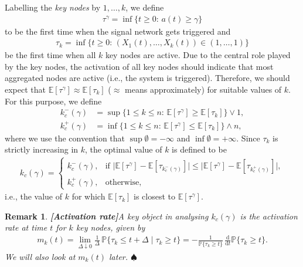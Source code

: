 \documentclass[11pt]{article}
\newtheorem{Remark}[Theorem]{Remark}
\numberwithin{equation}{section}
\renewcommand{\P}{\mathbb{P}}
\begin{document}
Labelling the \emph{key nodes} by $1,\ldots,k$, we define
\begin{align*}
\tau^\gamma = \inf\big\{t\geq 0\colon\, a(t)\geq \gamma\big\}
\end{align*}
to be the first time when the signal network gets triggered and
\begin{align*}
\tau_k = \inf\big\{t\geq 0\colon\, (X_{1}(t),\ldots ,X_k(t))\in (1,\ldots ,1)\big\}
\end{align*}
be the first time when all $k$ key nodes are active. Due to the central role played by the key nodes, the activation of all key nodes should indicate that most aggregated nodes are active (i.e., the system is triggered). Therefore, we should expect that $\mathbb{E}[\tau^\gamma] \approx \mathbb{E}[\tau_k]$ ($\approx$ means approximately) for suitable values of $k$. For this purpose, we define
\begin{align*}
k_c^-(\gamma) &= \sup\big\{1\leq k\leq n\colon\,\mathbb{E}[\tau^\gamma] \geq \mathbb{E}[\tau_k]\big\}\vee 1,\\
k_c^+(\gamma) &=\inf\big\{1\leq k\leq n\colon\,\mathbb{E}[\tau^\gamma] \leq \mathbb{E}[\tau_k]\big\}\wedge n,
\end{align*}
where we use the convention that $\sup\emptyset=-\infty$ and $\inf\emptyset=+\infty$. Since $\tau_k$ is strictly increasing in $k$, the optimal value of $k$ is defined to be
\begin{align*}
k_c(\gamma)  =
\begin{cases}
k_c^-(\gamma), &\text{if } \big|\mathbb{E}[\tau^\gamma] - \mathbb{E}[\tau_{k_c^-(\gamma)}]\big|\leq  \big|\mathbb{E}[\tau^\gamma] - \mathbb{E}[\tau_{k_c^+(\gamma)}]\big|,\\
k_c^+(\gamma), & \text{otherwise},
\end{cases}
\end{align*}
i.e., the value of $k$ for which $\mathbb{E}[\tau_k]$ is closest to $\mathbb{E}[\tau^\gamma]$.

\begin{Remark}{\bf [Activation rate]}\label{rem:act}
\rm{A key object in analysing $k_c(\gamma)$ is the activation rate at time $t$ for $k$ key nodes, given by
\begin{align*}
m_k(t) = \lim_{\Delta\downarrow 0} \frac{1}{\Delta}\,\P \big\{\tau_k \leq t+\Delta \mid \tau_k \geq t\big\}
= -\frac{1}{\P\{\tau_k\geq t\}}\,\frac{\mathrm{d}}{\mathrm{d}t}\P\{\tau_k\geq t\}.
\end{align*}
We will also look at $m_k(t)$ later. \hfill$\spadesuit$
}
\end{Remark}
\end{document}
